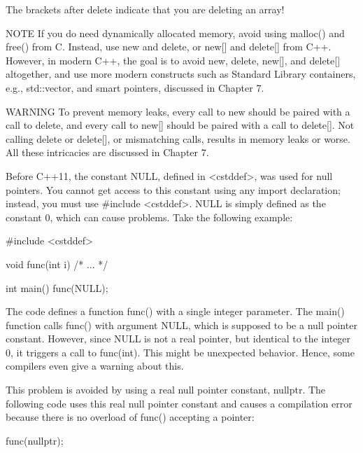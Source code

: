 The brackets after delete indicate that you are deleting an array!


\begin{myNotic}{NOTE}
If you do need dynamically allocated memory, avoid using malloc() and free() from C. Instead, use new and delete, or new[] and delete[] from C++. However, in modern C++, the goal is to avoid new, delete, new[], and delete[] altogether, and use more modern constructs such as Standard Library containers, e.g., std::vector, and smart pointers, discussed in Chapter 7.
\end{myNotic}

\begin{myWarning}{WARNING}
To prevent memory leaks, every call to new should be paired with a call to delete, and every call to new[] should be paired with a call to delete[]. Not calling delete or delete[], or mismatching calls, results in memory leaks or worse. All these intricacies are discussed in Chapter 7.
\end{myWarning}


Before C++11, the constant NULL, defined in <cstddef>, was used for null pointers. You cannot get access to this constant using any import declaration; instead, you must use \#include <cstddef>. NULL is simply defined as the constant 0, which can cause problems. Take the following example:

\begin{cpp}
#include <cstddef>

void func(int i) { /* ... */ }

int main()
{
    func(NULL);
}
\end{cpp}

The code defines a function func() with a single integer parameter. The main() function calls func() with argument NULL, which is supposed to be a null pointer constant. However, since NULL is not a real pointer, but identical to the integer 0, it triggers a call to func(int). This might be unexpected behavior. Hence, some compilers even give a warning about this.

This problem is avoided by using a real null pointer constant, nullptr. The following code uses this real null pointer constant and causes a compilation error because there is no overload of func() accepting a pointer:

\begin{cpp}
func(nullptr);
\end{cpp}

